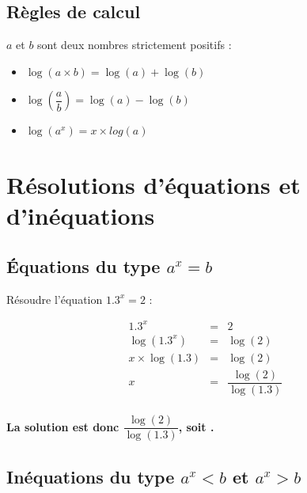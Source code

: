 \documentclass[12pt,a4paper]{article}
\begin{document}
\subsection{Règles de calcul}

\begin{myprops}
	$a$ et $b$ sont deux nombres strictement positifs :
	
	\begin{multicols}{2}
		\begin{itemize}
			
			\item $\log (a \times b) = \log (a) + \log (b) $
			\item $\log  \left( \dfrac{a}{b} \right) = \log (a) - \log (b) $
			\item $\log(a^x) = x \times log (a) $

	\end{itemize}
	\end{multicols}
\end{myprops}

\section{Résolutions d'\'equations et d'inéquations}

\subsection{\'Equations du type $a^x=b$}

\begin{myex}
	Résoudre l'équation $\num{1.3}^x = 2$ :
	
	\begin{eqnarray*}
		\num{1.3}^x &=& 2 \\
		\log(\num{1.3}^x) &=& \log(2) \\
		x \times \log(\num{1.3}) &=& \log(2) \\
		x &=& \dfrac{\log(2)}{\log(\num{1.3})}\\
	\end{eqnarray*}

\textbf{La solution est donc $\dfrac{\log(2)}{\log(\num{1.3})}$, soit .}
\end{myex}

\subsection{Inéquations du type $a^x<b$ et $a^x>b$}
\end{document}
